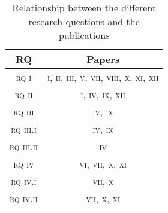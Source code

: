 \begin{table}[h]
\centering
\caption{Relationship between the different research questions and the publications}\label{table:RQPapers}
\begin{tabular}{|c|c|}
\hline
\rule{0pt}{12pt}
RQ&Papers\\ \hline
\textsc{rq i} & \textsc{i, ii, iii, v, vii, viii, x, xi, xii}\\
\hline
\textsc{rq ii} & \textsc{i, iv, ix, xii}\\ \hline
\textsc{rq iii} & \textsc{iv, ix}\\ %
\textsc{rq iii.i} & \textsc{iv, ix}\\ %
\textsc{rq iii.ii} & \textsc{iv}\\ \hline

\textsc{rq iv} & \textsc{vi, vii, x, xi}\\ %
\textsc{rq iv.i} & \textsc{vii, x}\\ %
\textsc{rq iv.ii} & \textsc{vii, x, xi}\\ \hline

\end{tabular}
\end{table}
\bigskip




